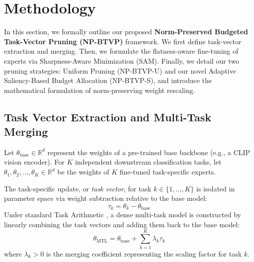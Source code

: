 \section{Methodology}
\label{submission:sec:method}

In this section, we formally outline our proposed \textbf{Norm-Preserved Budgeted Task-Vector Pruning (NP-BTVP)} framework. We first define task-vector extraction and merging. Then, we formulate the flatness-aware fine-tuning of experts via Sharpness-Aware Minimization (SAM). Finally, we detail our two pruning strategies: Uniform Pruning (NP-BTVP-U) and our novel Adaptive Saliency-Based Budget Allocation (NP-BTVP-S), and introduce the mathematical formulation of norm-preserving weight rescaling.

\subsection{Task Vector Extraction and Multi-Task Merging}
Let $\theta_{\text{base}} \in \mathbb{R}^d$ represent the weights of a pre-trained base backbone (e.g., a CLIP vision encoder). For $K$ independent downstream classification tasks, let $\theta_1, \theta_2, \dots, \theta_K \in \mathbb{R}^d$ be the weights of $K$ fine-tuned task-specific experts. 

The task-specific update, or \emph{task vector}, for task $k \in \{1, \dots, K\}$ is isolated in parameter space via weight subtraction relative to the base model:
\begin{equation}
\tau_k = \theta_k - \theta_{\text{base}}
\end{equation}
Under standard Task Arithmetic \cite{ilharco2022editing}, a dense multi-task model is constructed by linearly combining the task vectors and adding them back to the base model:
\begin{equation}
\theta_{\text{MTL}} = \theta_{\text{base}} + \sum_{k=1}^K \lambda_k \tau_k
\end{equation}
where $\lambda_k > 0$ is the merging coefficient representing the scaling factor for task $k$.

